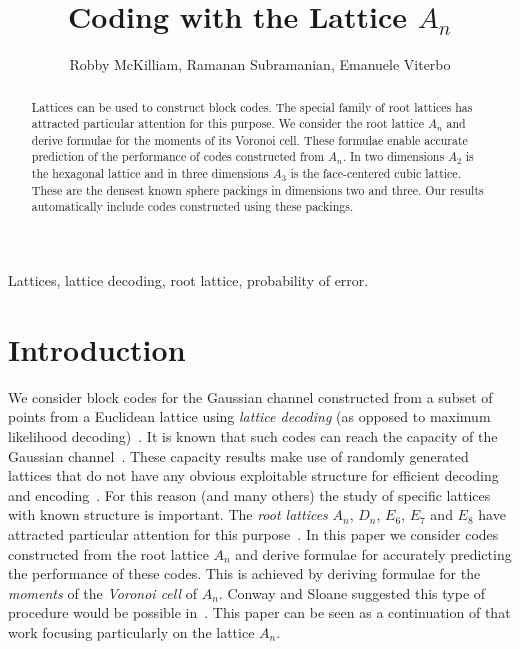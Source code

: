\documentclass[draftcls, onecolumn, 11pt]{IEEEtran}
\title{Coding with the Lattice $A_n$}
\author{Robby McKilliam, Ramanan Subramanian, Emanuele Viterbo}
\begin{document}
\newcommand{\calR}{\mathcal{R}}
\newcommand{\hist}{\operatorname{hist}}

\maketitle

\begin{abstract}
Lattices can be used to construct block codes.  The special family of root lattices has attracted particular attention for this purpose.  We consider the root lattice $A_n$ and derive formulae for the moments of its Voronoi cell.  These formulae enable accurate prediction of the performance of codes constructed from $A_n$.  In two dimensions $A_2$ is the hexagonal lattice and in three dimensions $A_3$ is the face-centered cubic lattice.  These are the densest known sphere packings in dimensions two and three.  Our results automatically include codes constructed using these packings.
\end{abstract}

\begin{keywords}
Lattices, lattice decoding, root lattice, probability of error.
\end{keywords}

\section{Introduction}\label{sec:introduction}

We consider block codes for the Gaussian channel constructed from a subset of points from a Euclidean lattice using \emph{lattice decoding} (as opposed to maximum likelihood decoding)~\cite{Erex2004_lattice_decoding}.  It is known that such codes can reach the capacity of the Gaussian channel~\cite{Buda1989_some_opt_codes_structure,Erez2005,Erex2004_lattice_decoding}.  These capacity results make use of randomly generated lattices that do not have any obvious exploitable structure for efficient decoding and encoding~\cite{Jalden2005_sphere_decoding_complexity}.  For this reason (and many others) the study of specific lattices with known structure is important.  The \emph{root lattices} $A_n$, $D_n$, $E_6$, $E_7$ and $E_8$ have attracted particular attention for this purpose~\cite{SPLAG}.  In this paper we consider codes constructed from the root lattice $A_n$ and derive formulae for accurately predicting the performance of these codes.  This is achieved by deriving formulae for the \emph{moments} of the \emph{Voronoi cell} of $A_n$.  Conway and Sloane suggested this type of procedure would be possible in~\cite{Conway1982VoronoiRegions}.  This paper can be seen as a continuation of that work focusing particularly on the lattice $A_n$.
\end{document}
